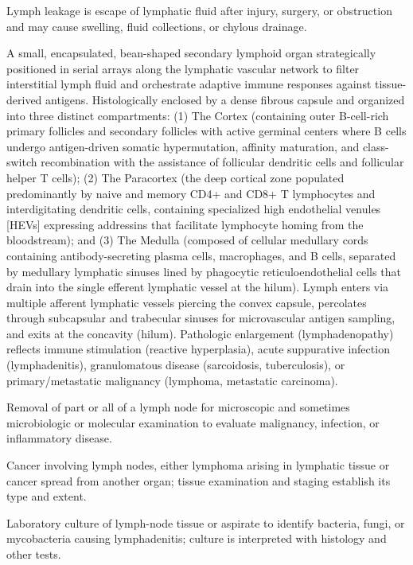  Lymph leakage is escape of lymphatic fluid after injury, surgery, or obstruction and may cause swelling, fluid collections, or chylous drainage.

 A small, encapsulated, bean-shaped secondary lymphoid organ strategically positioned in serial arrays along the lymphatic vascular network to filter interstitial lymph fluid and orchestrate adaptive immune responses against tissue-derived antigens. Histologically enclosed by a dense fibrous capsule and organized into three distinct compartments: (1) The Cortex (containing outer B-cell-rich primary follicles and secondary follicles with active germinal centers where B cells undergo antigen-driven somatic hypermutation, affinity maturation, and class-switch recombination with the assistance of follicular dendritic cells and follicular helper T cells); (2) The Paracortex (the deep cortical zone populated predominantly by naive and memory CD4+ and CD8+ T lymphocytes and interdigitating dendritic cells, containing specialized high endothelial venules [HEVs] expressing addressins that facilitate lymphocyte homing from the bloodstream); and (3) The Medulla (composed of cellular medullary cords containing antibody-secreting plasma cells, macrophages, and B cells, separated by medullary lymphatic sinuses lined by phagocytic reticuloendothelial cells that drain into the single efferent lymphatic vessel at the hilum). Lymph enters via multiple afferent lymphatic vessels piercing the convex capsule, percolates through subcapsular and trabecular sinuses for microvascular antigen sampling, and exits at the concavity (hilum). Pathologic enlargement (lymphadenopathy) reflects immune stimulation (reactive hyperplasia), acute suppurative infection (lymphadenitis), granulomatous disease (sarcoidosis, tuberculosis), or primary/metastatic malignancy (lymphoma, metastatic carcinoma).

 Removal of part or all of a lymph node for microscopic and sometimes microbiologic or molecular examination to evaluate malignancy, infection, or inflammatory disease.

 Cancer involving lymph nodes, either lymphoma arising in lymphatic tissue or cancer spread from another organ; tissue examination and staging establish its type and extent.

 Laboratory culture of lymph-node tissue or aspirate to identify bacteria, fungi, or mycobacteria causing lymphadenitis; culture is interpreted with histology and other tests.

